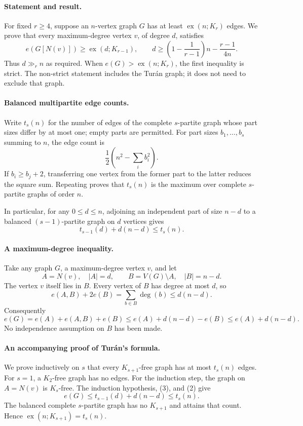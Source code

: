 \paragraph{Statement and result.}
For fixed \(r\geq4\), suppose an \(n\)-vertex graph \(G\) has at least \(\operatorname{ex}(n;K_r)\) edges. We prove that every maximum-degree vertex \(v\), of degree \(d\), satisfies
\[
 e(G[N(v)])\geq\operatorname{ex}(d;K_{r-1}),
 \qquad d\geq\left(1-\frac1{r-1}\right)n-\frac{r-1}{4n}.
 \tag{1}
\]
Thus \(d\gg_r n\) as required. When \(e(G)>\operatorname{ex}(n;K_r)\), the first inequality is strict. The non-strict statement includes the Tur\'an graph; it does not need to exclude that graph.

\paragraph{Balanced multipartite edge counts.}
Write \(t_s(n)\) for the number of edges of the complete \(s\)-partite graph whose part sizes differ by at most one; empty parts are permitted. For part sizes \(b_1,\ldots,b_s\) summing to \(n\), the edge count is
\[
 \frac12\left(n^2-\sum_i b_i^2\right).
\]
If \(b_i\geq b_j+2\), transferring one vertex from the former part to the latter reduces the square sum. Repeating proves that \(t_s(n)\) is the maximum over complete \(s\)-partite graphs of order \(n\).

In particular, for any \(0\leq d\leq n\), adjoining an independent part of size \(n-d\) to a balanced \((s-1)\)-partite graph on \(d\) vertices gives
\[
 t_{s-1}(d)+d(n-d)\leq t_s(n). \tag{2}
\]

\paragraph{A maximum-degree inequality.}
Take any graph \(G\), a maximum-degree vertex \(v\), and let
\[
 A=N(v),\quad |A|=d,\qquad B=V(G)\setminus A,\quad |B|=n-d.
\]
The vertex \(v\) itself lies in \(B\). Every vertex of \(B\) has degree at most \(d\), so
\[
 e(A,B)+2e(B)=\sum_{b\in B}\deg(b)\leq d(n-d).
\]
Consequently
\[
 e(G)=e(A)+e(A,B)+e(B)
 \leq e(A)+d(n-d)-e(B)
 \leq e(A)+d(n-d). \tag{3}
\]
No independence assumption on \(B\) has been made.

\paragraph{An accompanying proof of Tur\'an's formula.}
We prove inductively on \(s\) that every \(K_{s+1}\)-free graph has at most \(t_s(n)\) edges. For \(s=1\), a \(K_2\)-free graph has no edges. For the induction step, the graph on \(A=N(v)\) is \(K_s\)-free. The induction hypothesis, (3), and (2) give
\[
 e(G)\leq t_{s-1}(d)+d(n-d)\leq t_s(n).
\]
The balanced complete \(s\)-partite graph has no \(K_{s+1}\) and attains that count. Hence
\(\operatorname{ex}(n;K_{s+1})=t_s(n)\).

